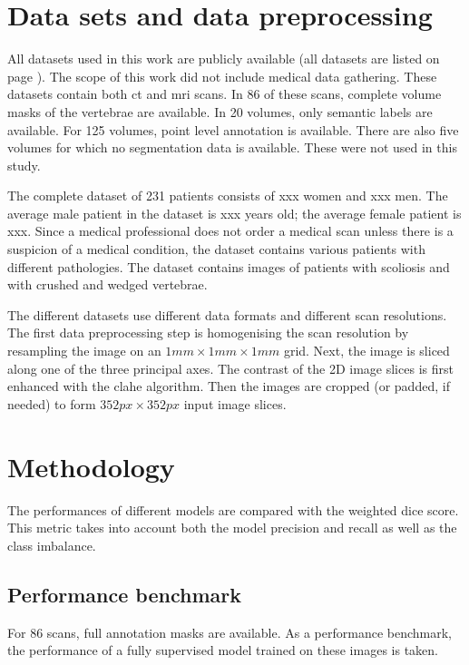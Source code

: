 \begin{multicols}{2}
\section*{Data sets and data preprocessing \label{sec:abstr_data}}
\par{
    All datasets used in this work are publicly available (all datasets are listed on page \pageref{sec:datasets}). 
    The scope of this work did not include medical data gathering.
    These datasets contain both \acrshort{ct} and \acrshort{mri} scans. 
    In 86 of these scans, complete volume masks of the vertebrae are available. 
    In 20 volumes, only semantic labels are available.
    For 125 volumes, point level annotation is available. There are also five volumes for which no segmentation data is available. These were not used in this study.
}
\par{
    The complete dataset of 231 patients consists of xxx women and xxx men. 
    The average male patient in the dataset is xxx years old; the average female patient is xxx.
    Since a medical professional does not order a medical scan unless there is a suspicion of a medical condition, the dataset contains various patients with different pathologies.
    The dataset contains images of patients with scoliosis and with crushed and wedged vertebrae.
}
\par{
    The different datasets use different data formats and different scan resolutions. 
    The first data preprocessing step is homogenising the scan resolution by resampling the image on an $1mm\times 1mm\times 1mm$ grid. 
    Next, the image is sliced along one of the three principal axes.
    The contrast of the 2D image slices is first enhanced with the \acrfull{clahe} algorithm.
    Then the images are cropped (or padded, if needed) to form $352 px \times 352 px$ input image slices.
}


\section*{Methodology}

The performances of different models are compared with the weighted dice score.
This metric takes into account both the model precision and recall as well as the class imbalance.

\subsection*{Performance benchmark}
For 86 scans, full annotation masks are available.
As a performance benchmark, the performance of a fully supervised model trained on these images is taken.



\end{multicols}
